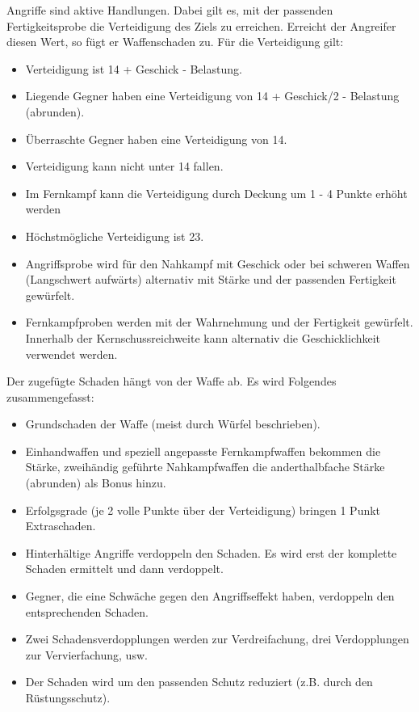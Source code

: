 \documentclass{article}
\begin{document}
Angriffe sind aktive Handlungen. Dabei gilt es, mit der passenden Fertigkeitsprobe die Verteidigung des Ziels zu
erreichen. Erreicht der Angreifer diesen Wert, so fügt er Waffenschaden zu. Für die Verteidigung gilt:

\begin{itemize}
\item Verteidigung ist 14 + Geschick - Belastung.
\item Liegende Gegner haben eine Verteidigung von 14 + Geschick/2 - Belastung (abrunden).
\item Überraschte Gegner haben eine Verteidigung von 14.
\item Verteidigung kann nicht unter 14 fallen.
\item Im Fernkampf kann die Verteidigung durch Deckung um 1 - 4 Punkte erhöht werden
\item Höchstmögliche Verteidigung ist 23.
\item Angriffsprobe wird für den Nahkampf mit Geschick oder bei schweren Waffen (Langschwert aufwärts) alternativ mit Stärke und der passenden Fertigkeit gewürfelt.
\item Fernkampfproben werden mit der Wahrnehmung und der Fertigkeit gewürfelt. Innerhalb der Kernschussreichweite kann alternativ die Geschicklichkeit verwendet werden.
\end{itemize}

Der zugefügte Schaden hängt von der Waffe ab. Es wird Folgendes zusammengefasst:

\begin{itemize}
\item Grundschaden der Waffe (meist durch Würfel beschrieben).
\item Einhandwaffen und speziell angepasste Fernkampfwaffen bekommen die Stärke, zweihändig geführte Nahkampfwaffen die anderthalbfache Stärke (abrunden) als Bonus hinzu.
\item Erfolgsgrade (je 2 volle Punkte über der Verteidigung) bringen 1 Punkt Extraschaden.
\item Hinterhältige Angriffe verdoppeln den Schaden. Es wird erst der komplette Schaden ermittelt und dann verdoppelt.
\item Gegner, die eine Schwäche gegen den Angriffseffekt haben, verdoppeln den entsprechenden Schaden.
\item Zwei Schadensverdopplungen werden zur Verdreifachung, drei Verdopplungen zur Vervierfachung, usw.
\item Der Schaden wird um den passenden Schutz reduziert (z.B. durch den Rüstungsschutz).
\end{itemize}
\end{document}
